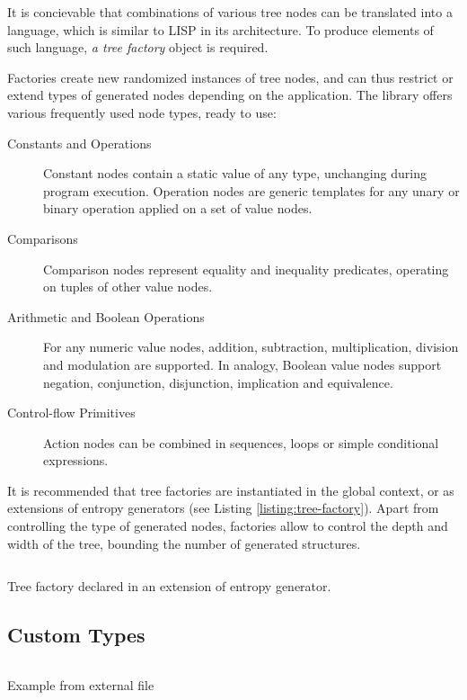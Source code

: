 It is concievable that combinations of various tree nodes can be translated into a language, which is similar to LISP in its architecture. To produce elements of such language, \textit{a tree factory} object is required.

Factories create new randomized instances of tree nodes, and can thus restrict or extend types of generated nodes depending on the application. The library offers various frequently used node types, ready to use:
~
\begin{description}
	\item[Constants and Operations]
	Constant nodes contain a static value of any type, unchanging during program execution. Operation nodes are generic templates for any unary or binary operation applied on a set of value nodes.

	\item[Comparisons]
	Comparison nodes represent equality and inequality predicates, operating on tuples of other value nodes.

	\item[Arithmetic and Boolean Operations]
	For any numeric value nodes, addition, subtraction, multiplication, division and modulation are supported. In analogy, Boolean value nodes support negation, conjunction, disjunction, implication and equivalence.

	\item[Control-flow Primitives]
	Action nodes can be combined in sequences, loops or simple conditional expressions.
\end{description}

It is recommended that tree factories are instantiated in the global context, or as extensions of entropy generators (see Listing \ref{listing:tree-factory}). Apart from controlling the type of generated nodes, factories allow to control the depth and width of the tree, bounding the number of generated structures.

\begin{listing}[ht]
	\inputminted{swift}{../code/tree-factory.swift}
	\caption{Tree factory declared in an extension of entropy generator.}
	\label{listing:tree-factory}
\end{listing}

\subsection{Custom Types}\label{section:custom-types}
\todo

\begin{listing}[ht]
\inputminted{swift}{../code/vector-sample.swift}
\caption{Example from external file}
\label{listing:3}
\end{listing}

